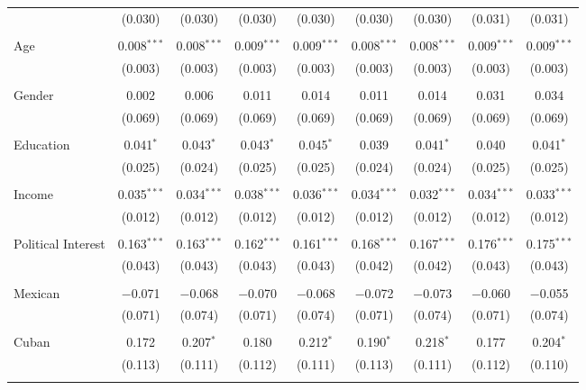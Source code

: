 \begin{table}[!htbp]
\begin{tabular}{@{\extracolsep{5pt}}lcccccccc}
  & (0.030) & (0.030) & (0.030) & (0.030) & (0.030) & (0.030) & (0.031) & (0.031) \\ 
  & & & & & & & & \\ 
 Age & 0.008$^{***}$ & 0.008$^{***}$ & 0.009$^{***}$ & 0.009$^{***}$ & 0.008$^{***}$ & 0.008$^{***}$ & 0.009$^{***}$ & 0.009$^{***}$ \\ 
  & (0.003) & (0.003) & (0.003) & (0.003) & (0.003) & (0.003) & (0.003) & (0.003) \\ 
  & & & & & & & & \\ 
 Gender & 0.002 & 0.006 & 0.011 & 0.014 & 0.011 & 0.014 & 0.031 & 0.034 \\ 
  & (0.069) & (0.069) & (0.069) & (0.069) & (0.069) & (0.069) & (0.069) & (0.069) \\ 
  & & & & & & & & \\ 
 Education & 0.041$^{*}$ & 0.043$^{*}$ & 0.043$^{*}$ & 0.045$^{*}$ & 0.039 & 0.041$^{*}$ & 0.040 & 0.041$^{*}$ \\ 
  & (0.025) & (0.024) & (0.025) & (0.025) & (0.024) & (0.024) & (0.025) & (0.025) \\ 
  & & & & & & & & \\ 
 Income & 0.035$^{***}$ & 0.034$^{***}$ & 0.038$^{***}$ & 0.036$^{***}$ & 0.034$^{***}$ & 0.032$^{***}$ & 0.034$^{***}$ & 0.033$^{***}$ \\ 
  & (0.012) & (0.012) & (0.012) & (0.012) & (0.012) & (0.012) & (0.012) & (0.012) \\ 
  & & & & & & & & \\ 
 Political Interest & 0.163$^{***}$ & 0.163$^{***}$ & 0.162$^{***}$ & 0.161$^{***}$ & 0.168$^{***}$ & 0.167$^{***}$ & 0.176$^{***}$ & 0.175$^{***}$ \\ 
  & (0.043) & (0.043) & (0.043) & (0.043) & (0.042) & (0.042) & (0.043) & (0.043) \\ 
  & & & & & & & & \\ 
 Mexican & $-$0.071 & $-$0.068 & $-$0.070 & $-$0.068 & $-$0.072 & $-$0.073 & $-$0.060 & $-$0.055 \\ 
  & (0.071) & (0.074) & (0.071) & (0.074) & (0.071) & (0.074) & (0.071) & (0.074) \\ 
  & & & & & & & & \\ 
 Cuban & 0.172 & 0.207$^{*}$ & 0.180 & 0.212$^{*}$ & 0.190$^{*}$ & 0.218$^{*}$ & 0.177 & 0.204$^{*}$ \\ 
  & (0.113) & (0.111) & (0.112) & (0.111) & (0.113) & (0.111) & (0.112) & (0.110) \\ 
  & & & & & & & & \\ 

\end{tabular}
\end{table}
